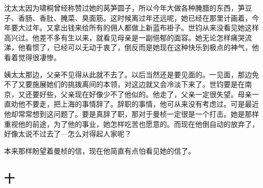 \par 沈太太因为啸桐曾经称赞过她的莴笋圆子，所以今年大做各种腌腊的东西，笋豆子、香肠、香肚、腌菜、臭面筋。这时候离过年还远呢，她已经在那里计画着，今年要大过年。又拿出钱来给所有的佣人都做上新蓝布褂子。世钧从来没看见她这样高兴过。他差不多有生以来，就看见母亲是一副悒郁的面容。她无论怎样痛哭流涕，他看惯了，已经可以无动于衷了，倒反而是她现在这种快乐到极点的神气，他看着觉得很凄惨。
\par 姨太太那边，父亲不见得从此就不去了。以后当然还是要见面的。一见面，那边免不了又要施展她们的挑拨离间的本领，对这边就又会冷淡下来了。世钧要是在南京，又还要好些，父亲现在好像少不了他似的。他走了，父亲一定很失望。母亲一直劝他不要走，把上海的事情辞了。辞职的事情，他可从来没有考虑过。可是最近他却常常想到这问题了。要是真辞了职，那对于曼桢一定很是一个打击。她是那样重视他的前途，为了他的事业，她怎样吃苦也愿意的。而现在他倒自动的放弃了，好像太说不过去了—怎么对得起人家呢？
\par 本来那样盼望着曼桢的信，现在他简直有点怕看见她的信了。


\subsection{十}

